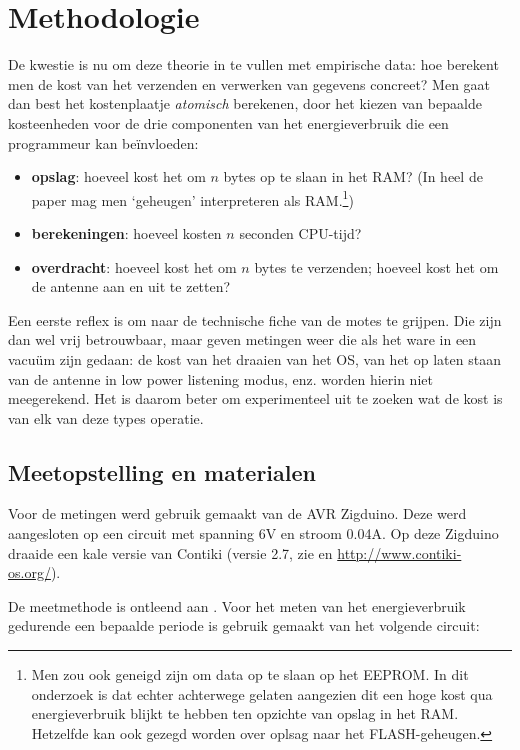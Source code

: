 \documentclass[11pt]{article}
\begin{document}
\section{Methodologie}

De kwestie is nu om deze theorie in te vullen met empirische data: hoe berekent
men de kost van het verzenden en verwerken van gegevens concreet? Men gaat dan
best het kostenplaatje \textit{atomisch} berekenen, door het kiezen van bepaalde
kosteenheden voor de drie componenten van het energieverbruik die een
programmeur kan be\"invloeden:

\begin{itemize}
\item \textbf{opslag}: hoeveel kost het om $n$ bytes op te slaan in het RAM? (In
heel de paper mag men `geheugen' interpreteren als RAM.\footnote{Men zou ook
geneigd zijn om data op te slaan op het EEPROM. In dit onderzoek is dat echter
achterwege gelaten aangezien dit een hoge kost qua energieverbruik blijkt te
hebben ten opzichte van opslag in het RAM. Hetzelfde kan ook gezegd worden over
oplsag naar het FLASH-geheugen.})
\item \textbf{berekeningen}: hoeveel kosten $n$ seconden CPU-tijd?
\item \textbf{overdracht}: hoeveel kost het om $n$ bytes te verzenden; hoeveel
kost het om de antenne aan en uit te zetten?
\end{itemize}

Een eerste reflex is om naar de technische fiche van de motes te grijpen. Die
zijn dan wel vrij betrouwbaar, maar geven metingen weer die als het ware in een
vacu\"um zijn gedaan: de kost van het draaien van het OS, van het op laten staan
van de antenne in low power listening modus, enz. worden hierin niet
meegerekend. Het is daarom beter om experimenteel uit te zoeken wat de kost is
van elk van deze types operatie.

\subsection{Meetopstelling en materialen}

Voor de metingen werd gebruik gemaakt van de AVR Zigduino. Deze werd
aangesloten op een circuit met spanning 6V en stroom 0.04A.
Op deze Zigduino draaide een kale versie van Contiki (versie 2.7, zie \cite{dunkels2004contiki} en \url{http://www.contiki-os.org/}).

De meetmethode is ontleend aan \cite{hughes2013energy}. Voor het meten van het
energieverbruik gedurende een bepaalde periode is gebruik gemaakt van het
volgende circuit:
\end{document}
